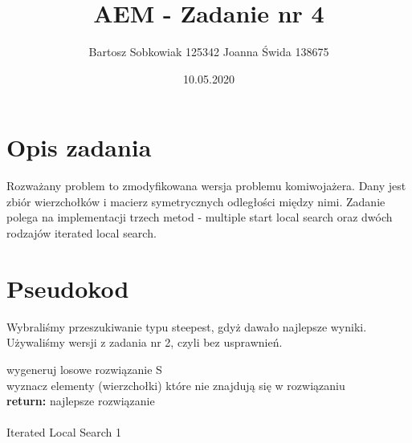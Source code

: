 \documentclass{article}
\title{AEM - Zadanie nr 4}
\author{Bartosz Sobkowiak 125342 Joanna Świda 138675}
\date{10.05.2020}
\begin{document}
\maketitle
\section{Opis zadania}

    Rozważany problem to zmodyfikowana wersja problemu komiwojażera. Dany jest zbiór wierzchołków i macierz symetrycznych odległości między nimi. Zadanie polega na implementacji trzech metod - multiple start local search oraz dwóch rodzajów iterated local search.

\section{Pseudokod}

Wybraliśmy przeszukiwanie typu steepest, gdyż dawało najlepsze wyniki. \\
Używaliśmy wersji z zadania nr 2, czyli bez usprawnień.

\vspace{10mm}

\begin{algorithm}[H]
     
    wygeneruj losowe rozwiązanie S\\
    wyznacz elementy (wierzchołki) które nie znajdują się w rozwiązaniu \\
            \textbf{return:} najlepsze rozwiązanie \\ \\
            
            
\caption{Iterated Local Search 1}
\end{algorithm}
\end{document}
